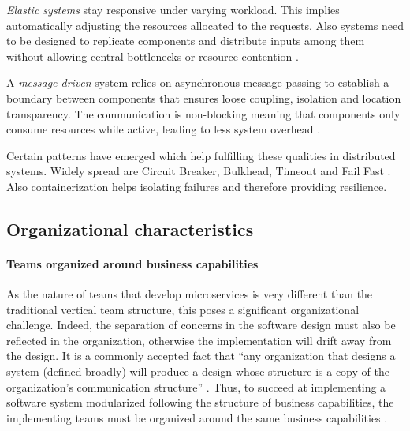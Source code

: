 \textit{Elastic systems} stay responsive under varying workload. 
This implies automatically adjusting the resources allocated to the requests.
Also systems need to be designed to replicate components and distribute inputs among them without allowing central bottlenecks or resource contention \citep{Reactive2014}.

A \textit{message driven} system relies on asynchronous message-passing to establish a boundary between components that ensures loose coupling, isolation and location transparency. The communication is non-blocking meaning that components only consume resources while active, leading to less system overhead \citep{Reactive2014}.

Certain patterns have emerged which help fulfilling these qualities in distributed systems. Widely spread are Circuit Breaker, Bulkhead, Timeout and Fail Fast \citep[p. 207-209]{Wolff2016} \citep{Netflix2012}. 
Also containerization helps isolating failures and therefore providing resilience.

\subsection{Organizational characteristics}
\label{bac:organisationalCharacteristics}

\paragraph{Teams organized around business capabilities}
\label{bac:teamsBusinessCapabilities}
As the nature of teams that develop microservices is very different than the traditional vertical team structure, this poses a significant organizational challenge.
Indeed, the separation of concerns in the software design must also be reflected in the organization, otherwise the implementation will drift away from the design.
It is a commonly accepted fact that ``any organization that designs a system (defined broadly) will produce a design whose structure is a copy of the organization's communication structure'' \citep{Conway1968}.
Thus, to succeed at implementing a software system modularized following the structure of business capabilities, the implementing teams must be organized around the same business capabilities \citep[p. 41]{Wolff2016}.

